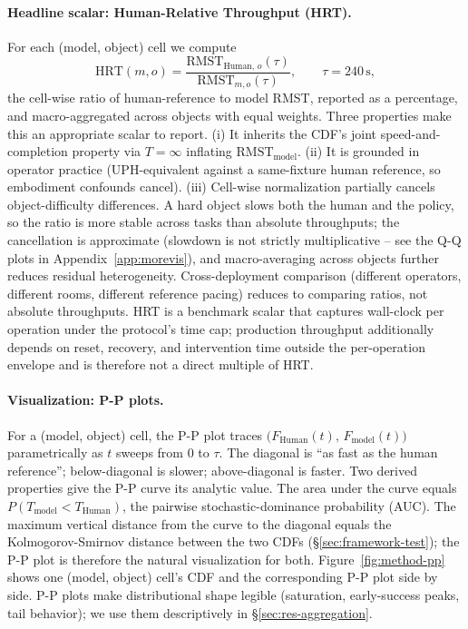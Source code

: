 \documentclass{article}
\begin{document}
\paragraph{Headline scalar: Human-Relative Throughput (HRT).} For each (model, object) cell we compute
\[
  \text{HRT}(m, o) = \frac{\text{RMST}_{\text{Human},\,o}(\tau)}{\text{RMST}_{m, o}(\tau)}, \qquad \tau = 240\,\text{s},
\]
the cell-wise ratio of human-reference to model RMST, reported as a percentage, and macro-aggregated across objects with equal weights. Three properties make this an appropriate scalar to report. (i) It inherits the CDF's joint speed-and-completion property via $T = \infty$ inflating $\text{RMST}_{\text{model}}$. (ii) It is grounded in operator practice (UPH-equivalent against a same-fixture human reference, so embodiment confounds cancel). (iii) Cell-wise normalization partially cancels object-difficulty differences. A hard object slows both the human and the policy, so the ratio is more stable across tasks than absolute throughputs; the cancellation is approximate (slowdown is not strictly multiplicative -- see the Q-Q plots in Appendix~\ref{app:morevis}), and macro-averaging across objects further reduces residual heterogeneity. Cross-deployment comparison (different operators, different rooms, different reference pacing) reduces to comparing ratios, not absolute throughputs. HRT is a benchmark scalar that captures wall-clock per operation under the protocol's time cap; production throughput additionally depends on reset, recovery, and intervention time outside the per-operation envelope and is therefore not a direct multiple of HRT.

\paragraph{Visualization: P-P plots.} For a (model, object) cell, the P-P plot traces $\big(F_{\text{Human}}(t),\, F_{\text{model}}(t)\big)$ parametrically as $t$ sweeps from $0$ to $\tau$. The diagonal is ``as fast as the human reference''; below-diagonal is slower; above-diagonal is faster. Two derived properties give the P-P curve its analytic value. The area under the curve equals $P(T_{\text{model}} < T_{\text{Human}})$, the pairwise stochastic-dominance probability (AUC). The maximum vertical distance from the curve to the diagonal equals the Kolmogorov-Smirnov distance between the two CDFs (\S\ref{sec:framework-test}); the P-P plot is therefore the natural visualization for both. Figure~\ref{fig:method-pp} shows one (model, object) cell's CDF and the corresponding P-P plot side by side. P-P plots make distributional shape legible (saturation, early-success peaks, tail behavior); we use them descriptively in \S\ref{sec:res-aggregation}.
\end{document}
